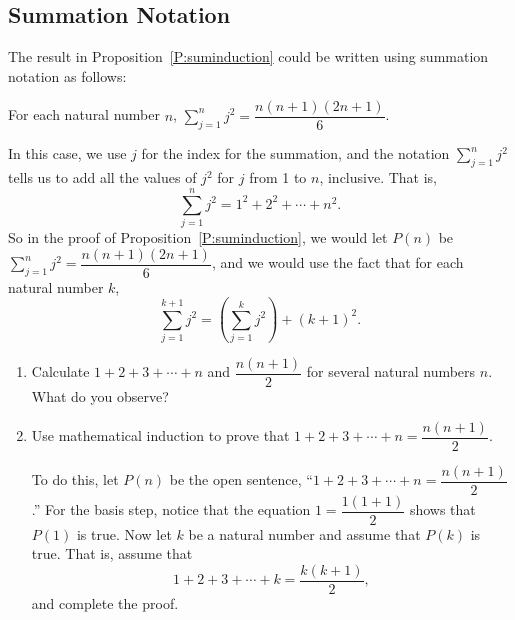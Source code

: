 \subsection*{Summation Notation}
The result in Proposition~\ref{P:suminduction} could be written using summation notation as follows:
%
\begin{center}
For each natural number $n$, $\sum\limits_{j = 1}^n {j^2 }  = \dfrac{{n(n + 1)(2n + 1)}}{6}$.
\end{center}
%
\noindent
In this case, we use  $j$  for the index for the summation, and the notation 
$\sum\limits_{j = 1}^n {j^2 }$
tells us to add all the values of  $j^2 $ for  $j$  from  1  to  $n$, inclusive.  That is, 
\[
\sum\limits_{j = 1}^n {j^2 }  = 1^2  + 2^2  +  \cdots  + n^2.
\]
So in the proof of Proposition~\ref{P:suminduction}, we would let $P( n )$  be  
$\sum\limits_{j = 1}^n {j^2 }  = \dfrac{{n(n + 1)(2n + 1)}}{6}$,
and we would use the fact that for each natural number  $k$,
\[
\sum\limits_{j = 1}^{k + 1} {j^2 }  = \left( {\sum\limits_{j = 1}^k {j^2 } } \right) + \left( {k + 1} \right)^2 .
\]
\hbreak
\setcounter{equation}{0}

%
\begin{prog} \label{prog:indexample} \hfill
\begin{enumerate}
\item Calculate  $1 + 2 + 3 +  \cdots  + n$ and $\dfrac{n(n + 1)}{2}$ 
for several natural numbers  $n$. What do you observe?

\item Use mathematical induction to prove that 
$1 + 2 + 3 +  \cdots  + n = \dfrac{n \left( n + 1 \right)}{2}$.

To do this, let $P ( n )$ be the open sentence, 
``$1 + 2 + 3 +  \cdots  + n = \dfrac{n \left( n + 1 \right)}{2}$.''  For the basis step, notice that the equation $1 = \dfrac{1 \left( 1 + 1 \right)}{2}$ shows that 
$P( 1 )$ is true.  Now let $k$ be a natural number and assume that 
$P (k )$ is true.  That is, assume that
\[
1 + 2 + 3 +  \cdots  + k = \frac{k \left( k + 1 \right)}{2},
\]
and complete the proof.
\end{enumerate}
\end{prog}
\hbreak

\endinput
